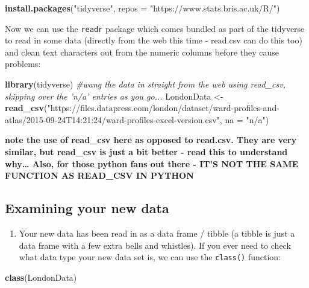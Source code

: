 \documentclass[]{book}
\newenvironment{Shaded}{\begin{snugshade}}{\end{snugshade}}
\newcommand{\CommentTok}[1]{\textcolor[rgb]{0.56,0.35,0.01}{\textit{#1}}}
\newcommand{\DataTypeTok}[1]{\textcolor[rgb]{0.13,0.29,0.53}{#1}}
\newcommand{\KeywordTok}[1]{\textcolor[rgb]{0.13,0.29,0.53}{\textbf{#1}}}
\newcommand{\NormalTok}[1]{#1}
\newcommand{\StringTok}[1]{\textcolor[rgb]{0.31,0.60,0.02}{#1}}
\providecommand{\tightlist}{%
  \setlength{\itemsep}{0pt}\setlength{\parskip}{0pt}}
\begin{document}
\begin{Shaded}
\begin{Highlighting}[]
\KeywordTok{install.packages}\NormalTok{(}\StringTok{"tidyverse"}\NormalTok{, }\DataTypeTok{repos =} \StringTok{"https://www.stats.bris.ac.uk/R/"}\NormalTok{)}
\end{Highlighting}
\end{Shaded}

Now we can use the \texttt{readr} package which comes bundled as part of the tidyverse to read in some data (directly from the web this time - read.csv can do this too) and clean text characters out from the numeric columns before they cause problems:

\begin{Shaded}
\begin{Highlighting}[]
\KeywordTok{library}\NormalTok{(tidyverse)}
\CommentTok{#wang the data in straight from the web using read_csv, skipping over the 'n/a' entries as you go...}
\NormalTok{LondonData <-}\StringTok{ }\KeywordTok{read_csv}\NormalTok{(}\StringTok{"https://files.datapress.com/london/dataset/ward-profiles-and-atlas/2015-09-24T14:21:24/ward-profiles-excel-version.csv"}\NormalTok{, }\DataTypeTok{na =} \StringTok{"n/a"}\NormalTok{)}
\end{Highlighting}
\end{Shaded}

\textbf{note the use of read\_csv here as opposed to read.csv. They are very similar, but read\_csv is just a bit better - read this to understand why\ldots{} Also, for those python fans out there - IT'S NOT THE SAME FUNCTION AS READ\_CSV IN PYTHON}

\hypertarget{examining-your-new-data}{%
\subsection{Examining your new data}\label{examining-your-new-data}}

\begin{enumerate}
\def\labelenumi{\arabic{enumi}.}
\setcounter{enumi}{24}
\tightlist
\item
  Your new data has been read in as a data frame / tibble (a tibble is just a data frame with a few extra bells and whistles). If you ever need to check what data type your new data set is, we can use the \texttt{class()} function:
\end{enumerate}

\begin{Shaded}
\begin{Highlighting}[]
\KeywordTok{class}\NormalTok{(LondonData)}
\end{Highlighting}
\end{Shaded}
\end{document}
